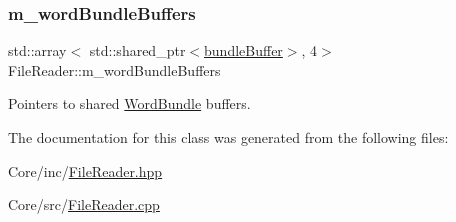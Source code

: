 \subsubsection{\texorpdfstring{m\+\_\+word\+Bundle\+Buffers}{m\_wordBundleBuffers}}
{\footnotesize\ttfamily std\+::array$<$ std\+::shared\+\_\+ptr$<$\hyperlink{class_file_reader_ac755c1e271610c2c12a7fc5b55cc048b}{bundle\+Buffer}$>$, 4$>$ File\+Reader\+::m\+\_\+word\+Bundle\+Buffers\hspace{0.3cm}{\ttfamily [private]}}



Pointers to shared \hyperlink{class_word_bundle}{Word\+Bundle} buffers. 



The documentation for this class was generated from the following files\+:\begin{DoxyCompactItemize}
\item 
Core/inc/\hyperlink{_file_reader_8hpp}{File\+Reader.\+hpp}\item 
Core/src/\hyperlink{_file_reader_8cpp}{File\+Reader.\+cpp}\end{DoxyCompactItemize}
